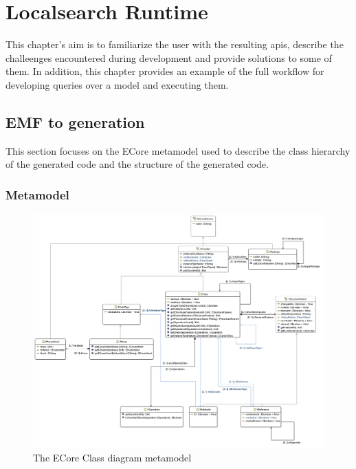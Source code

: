 \chapter{Localsearch Runtime}

This chapter's aim is to familiarize the user with the resulting apis, describe
the challeenges encountered during development and provide solutions to some of
them. In addition, this chapter provides an example of the full workflow for
developing queries over a model and executing them.

\section{EMF to \CPP{} generation} \label{sect:CppObjectModel}

This section focuses on the ECore metamodel used to describe the class hierarchy
of the generated code and the structure of the generated code.

\subsection{Metamodel}\label{sec:Metamodel}

\begin{figure}[!ht]
\centering
\includegraphics[width=160mm, keepaspectratio]{figures/ecore_diagram.png}
\caption{The ECore Class diagram metamodel}
\label{fig:metamodel}
\end{figure}

